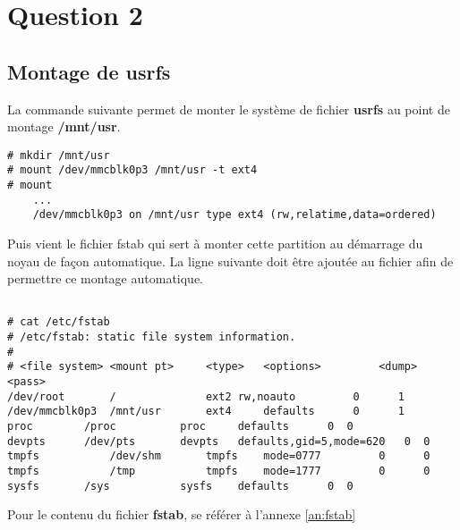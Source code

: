 
\chapter{Question 2} %

\label{Question 2} %


\section{Montage de usrfs}
La commande suivante permet de monter le système de fichier \textbf{usrfs} au point de montage \textbf{/mnt/usr}.
\begin{lstlisting}[style=Console]
# mkdir /mnt/usr
# mount /dev/mmcblk0p3 /mnt/usr -t ext4
# mount
	...
	/dev/mmcblk0p3 on /mnt/usr type ext4 (rw,relatime,data=ordered)
\end{lstlisting}
Puis vient le fichier fstab qui sert à monter cette partition au démarrage du noyau de façon automatique. La ligne suivante doit être ajoutée au fichier afin de permettre ce montage automatique.
\begin{lstlisting}[frame=single,style=Console]  % Start your code-block

# cat /etc/fstab 
# /etc/fstab: static file system information.
#
# <file system> <mount pt>     <type>	<options>         <dump> <pass>
/dev/root       /              ext2	rw,noauto         0      1
/dev/mmcblk0p3	/mnt/usr       ext4     defaults	  0      1
proc		/proc	       proc     defaults	  0	 0
devpts		/dev/pts       devpts   defaults,gid=5,mode=620	  0	 0
tmpfs           /dev/shm       tmpfs    mode=0777         0      0
tmpfs           /tmp           tmpfs    mode=1777         0      0
sysfs		/sys	       sysfs    defaults	  0	 0
\end{lstlisting}
Pour le contenu du fichier \textbf{fstab}, se référer à l'annexe \ref{an:fstab}
